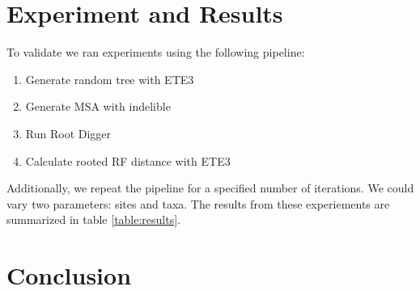 \documentclass{article}
\begin{document}

\section{Experiment and Results}


To validate we ran experiments using the following pipeline:

\begin{enumerate}
\item Generate random tree with ETE3 \cite{huerta-cepas_ete_2016}
\item Generate MSA with indelible \cite{fletcher_indelible:_2009}
\item Run Root Digger
\item Calculate rooted RF distance with ETE3 \cite{robinson_comparison_1981}
\end{enumerate}

Additionally, we repeat the pipeline for a specified number of iterations. We
could vary two parameters: sites and taxa. The results from these experiements
are summarized in table \ref{table:results}.

\begin{table}
\begin{center}
  
  \label{table:results}
\end{center}
\end{table}


\section{Conclusion}




\end{document}
